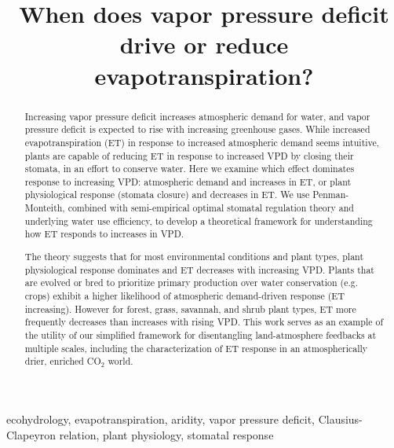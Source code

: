 \documentclass[draft,linenumbers]{agujournal}
\begin{document}
\title{When does vapor pressure deficit drive or reduce
  evapotranspiration?}



 


\begin{keypoints}
\item ecohydrology, evapotranspiration, aridity, vapor pressure
  deficit, Clausius-Clapeyron relation, plant physiology, stomatal
  response
\end{keypoints}


\begin{abstract}
  Increasing vapor pressure deficit increases atmospheric demand for
  water, and vapor pressure deficit is expected to rise with
  increasing greenhouse gases. While increased evapotranspiration (ET) in
  response to increased atmospheric demand seems intuitive, plants are
  capable of reducing ET in response to increased VPD by closing their
  stomata, in an effort to conserve water. Here we examine which
  effect dominates response to increasing VPD: atmospheric demand and
  increases in ET, or plant physiological response (stomata closure)
  and decreases in ET. We use Penman-Monteith, combined with
  semi-empirical optimal stomatal regulation theory and underlying
  water use efficiency, to develop a theoretical framework for
  understanding how ET responds to increases in VPD.
  
  The theory suggests that for most environmental conditions and plant
  types, plant physiological response dominates and ET decreases with
  increasing VPD. Plants that are evolved or bred to prioritize
  primary production over water conservation (e.g. crops) exhibit a
  higher likelihood of atmospheric demand-driven response (ET
  increasing). However for forest, grass, savannah, and shrub plant
  types, ET more frequently decreases than increases with rising
  VPD. This work serves as an example of the utility of
  our simplified framework for disentangling land-atmosphere feedbacks
  at multiple scales, including the characterization of ET response in
  an atmospherically drier, enriched CO$_2$ world.
 
\end{abstract}
\end{document}
